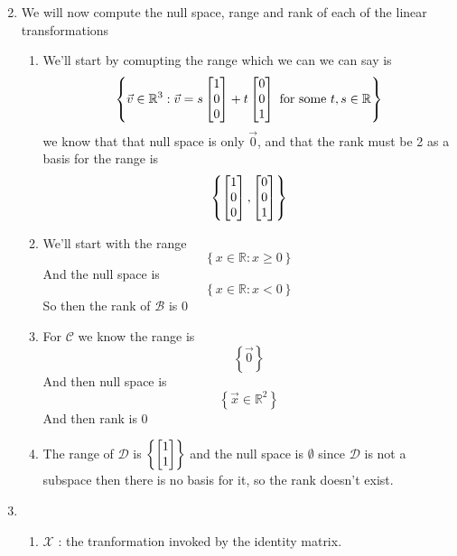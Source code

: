 \documentclass[11pt]{book}
\begin{document}
\begin{enumerate}
\begin{enumerate}
\begin{equation*}
        \end{equation*}
    \end{enumerate}
        \item We will now compute the null space, range and rank of each of the linear transformations
        \begin{enumerate}
            \item We'll start by comupting the range which we can we can say is
            \[
            \left\{ \vec{v} \in \mathbb{R}^3: \vec{v} = s \begin{bmatrix} 1 \\ 0 \\ 0 \end{bmatrix} + t \begin{bmatrix} 0 \\ 0 \\ 1 \end{bmatrix} \text{ for some } t, s \in \mathbb{R} \right\}
            \]
            we know that that null space is only $\vec{0}$, and that the rank must be 2 as a basis for the range is
            \[
            \left\{ \begin{bmatrix} 1 \\ 0 \\ 0 \end{bmatrix}, \begin{bmatrix} 0 \\ 0 \\ 1 \end{bmatrix} \right\}
            \]
            \item We'll start with the range
            \[
            \left\{ x \in \mathbb{R}: x \ge 0 \right\}
            \]
            And the null space is
            \[
            \left\{ x \in \mathbb{R}: x < 0 \right\}
            \]
            So then the rank of $\mathcal{B}$ is 0
            \item For $\mathcal{C}$ we know the range is
                \[
                \left\{ \vec{0} \right\}
                \]
                And then null space is 
                \[
                \left\{ \vec{x} \in \mathbb{R}^2 \right\}
                \]
                And then rank is 0
            \item The range of $\mathcal{D}$ is $\left\{ \begin{bmatrix} 1 \\ 1 \end{bmatrix} \right\}$ and the null space is $\emptyset$ since $\mathcal{D}$ is not a subspace then there is no basis for it, so the rank doesn't exist.
        \end{enumerate}
        \item 
        \begin{enumerate}
            \item $\mathcal{X}$ : the tranformation invoked by the identity matrix.

\end{enumerate}
\end{enumerate}
\end{document}
